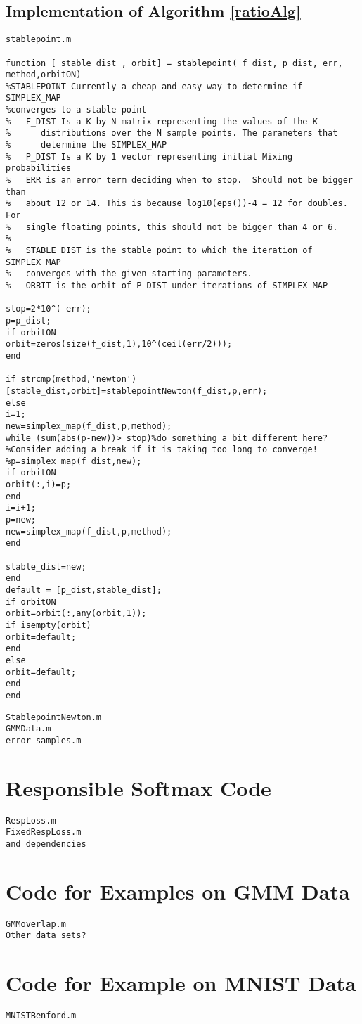 \section{Implementation of Algorithm \ref{ratioAlg}}\label{code:ratioAlg}
\begin{verbatim}
stablepoint.m

function [ stable_dist , orbit] = stablepoint( f_dist, p_dist, err, method,orbitON)
%STABLEPOINT Currently a cheap and easy way to determine if SIMPLEX_MAP
%converges to a stable point
%   F_DIST Is a K by N matrix representing the values of the K
%      distributions over the N sample points. The parameters that
%      determine the SIMPLEX_MAP
%   P_DIST Is a K by 1 vector representing initial Mixing probabilities
%   ERR is an error term deciding when to stop.  Should not be bigger than
%   about 12 or 14. This is because log10(eps())-4 = 12 for doubles. For
%   single floating points, this should not be bigger than 4 or 6.
%
%   STABLE_DIST is the stable point to which the iteration of SIMPLEX_MAP
%   converges with the given starting parameters.
%   ORBIT is the orbit of P_DIST under iterations of SIMPLEX_MAP

stop=2*10^(-err);
p=p_dist;
if orbitON
orbit=zeros(size(f_dist,1),10^(ceil(err/2)));
end

if strcmp(method,'newton')
[stable_dist,orbit]=stablepointNewton(f_dist,p,err);
else
i=1;
new=simplex_map(f_dist,p,method);
while (sum(abs(p-new))> stop)%do something a bit different here?
%Consider adding a break if it is taking too long to converge!
%p=simplex_map(f_dist,new);
if orbitON
orbit(:,i)=p;
end
i=i+1;
p=new;
new=simplex_map(f_dist,p,method);
end

stable_dist=new;
end
default = [p_dist,stable_dist];
if orbitON
orbit=orbit(:,any(orbit,1));
if isempty(orbit)
orbit=default;
end
else
orbit=default;
end
end
\end{verbatim}

\begin{verbatim}
StablepointNewton.m
GMMData.m
error_samples.m
\end{verbatim}

\chapter{Responsible Softmax Code}
\begin{verbatim}
RespLoss.m 
FixedRespLoss.m
and dependencies
\end{verbatim}
\chapter{Code for Examples on GMM Data}
\begin{verbatim}
GMMoverlap.m 
Other data sets?
\end{verbatim}
\chapter{Code for Example on MNIST Data}
\begin{verbatim}
MNISTBenford.m
\end{verbatim}